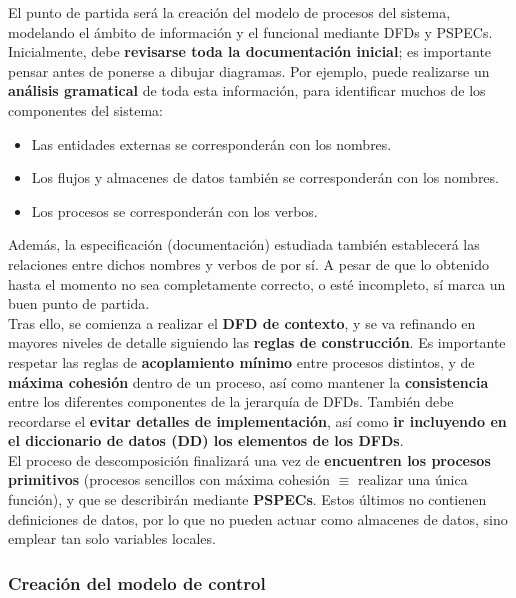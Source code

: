 El punto de partida será la creación del modelo de procesos del sistema, modelando el ámbito de información y el funcional mediante DFDs y PSPECs.\\

Inicialmente, debe \textbf{revisarse toda la documentación inicial}; es importante pensar antes de ponerse a dibujar diagramas. Por ejemplo, puede realizarse un \textbf{análisis gramatical} de toda esta información, para identificar muchos de los componentes del sistema:

\begin{itemize}
    \item Las entidades externas se corresponderán con los nombres.
    \item Los flujos y almacenes de datos también se corresponderán con los nombres.
    \item Los procesos se corresponderán con los verbos.
\end{itemize}

Además, la especificación (documentación) estudiada también establecerá las relaciones entre dichos nombres y verbos de por sí. A pesar de que lo obtenido hasta el momento no sea completamente correcto, o esté incompleto, sí marca un buen punto de partida.\\

Tras ello, se comienza a realizar el \textbf{DFD de contexto}, y se va refinando en mayores niveles de detalle siguiendo las \textbf{reglas de construcción}. Es importante respetar las reglas de \textbf{acoplamiento mínimo} entre procesos distintos, y de \textbf{máxima cohesión} dentro de un proceso, así como mantener la \textbf{consistencia} entre los diferentes componentes de la jerarquía de DFDs. También debe recordarse el \textbf{evitar detalles de implementación}, así como \textbf{ir incluyendo en el diccionario de datos (DD) los elementos de los DFDs}.\\

El proceso de descomposición finalizará una vez de \textbf{encuentren los procesos primitivos} (procesos sencillos con máxima cohesión $\equiv$ realizar una única función), y que se describirán mediante \textbf{PSPECs}. Estos últimos no contienen definiciones de datos, por lo que no pueden actuar como almacenes de datos, sino emplear tan solo variables locales.

\subsubsection{Creación del modelo de control}

